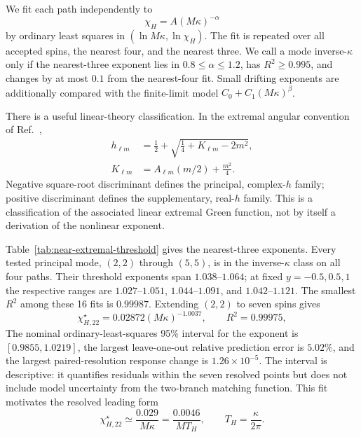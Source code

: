 \documentclass[aps,prd,twocolumn,10pt,nofootinbib,superscriptaddress,floatfix]{revtex4-2}
\begin{document}
We fit each path independently to
\begin{equation}
 \chi_H=A(M\kappa)^{-\alpha}
 \label{eq:modal_power_fit}
\end{equation}
by ordinary least squares in $(\ln M\kappa,\ln\chi_H)$.  The fit is repeated
over all accepted spins, the nearest four, and the nearest three.  We call a
mode inverse-$\kappa$ only if the nearest-three exponent lies in
$0.8\leq\alpha\leq1.2$, has $R^2\geq0.995$, and changes by at most $0.1$ from
the nearest-four fit.  Small drifting exponents are additionally compared
with the finite-limit model $C_0+C_1(M\kappa)^\beta$.

There is a useful linear-theory classification.  In the extremal angular
convention of Ref.~\cite{CasalsGrallaZimmerman2016},
\begin{equation}
 \begin{aligned}
 h_{\ell m}&=\frac12+
 \sqrt{\frac14+K_{\ell m}-2m^2},\\
 K_{\ell m}&=A_{\ell m}(m/2)+\frac{m^2}{4}.
 \end{aligned}
 \label{eq:conformal_weight}
\end{equation}
Negative square-root discriminant defines the principal, complex-$h$ family;
positive discriminant defines the supplementary, real-$h$ family.  This is a
classification of the associated linear extremal Green function, not by
itself a derivation of the nonlinear exponent.

Table~\ref{tab:near-extremal-threshold} gives the nearest-three exponents.
Every tested principal mode, $(2,2)$ through $(5,5)$, is in the
inverse-$\kappa$ class on all four paths.  Their threshold exponents span
$1.038$--$1.064$; at fixed $y=-0.5,0.5,1$ the respective ranges are
$1.027$--$1.051$, $1.044$--$1.091$, and $1.042$--$1.121$.  The smallest
$R^2$ among these 16 fits is $0.99987$.  Extending $(2,2)$ to seven spins gives
\begin{equation}
 \chi_{H,22}^\star=0.02872(M\kappa)^{-1.0037},
 \qquad R^2=0.99975,
 \label{eq:near_extremal_threshold_fit}
\end{equation}
The nominal ordinary-least-squares 95\% interval for the exponent is
$[0.9855,1.0219]$, the largest leave-one-out relative prediction error is
$5.02\%$, and the largest paired-resolution response change is
$1.26\times10^{-5}$.  The interval is descriptive: it quantifies residuals
within the seven resolved points but does not include model uncertainty from
the two-branch matching function.  This fit motivates the resolved leading form
\begin{equation}
 \chi_{H,22}^\star\simeq\frac{0.029}{M\kappa}
 =\frac{0.0046}{M T_H},
 \qquad T_H=\frac{\kappa}{2\pi}.
 \label{eq:inverse_kappa_response}
\end{equation}
\end{document}
